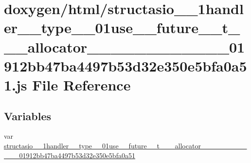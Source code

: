 \hypertarget{structasio__1__1handler____type__3__01use____future____t__3__01__allocator__01__4__00__01__01__0b458042eb63793051fb749e5370b64c7}{}\section{doxygen/html/structasio\+\_\+\_\+1handler\+\_\+\+\_\+type\+\_\+\_\+01use\+\_\+\+\_\+future\+\_\+\+\_\+t\+\_\+\_\+\_\+allocator\+\_\+\_\+\_\+\_\+\_\+\_\+\_\+\_\+\_\+\_\+\_\+\_\+01912bb47ba4497b53d32e350e5bfa0a51.js File Reference}
\label{structasio__1__1handler____type__3__01use____future____t__3__01__allocator__01__4__00__01__01__0b458042eb63793051fb749e5370b64c7}
\subsection*{Variables}
\begin{DoxyCompactItemize}
\item 
var \hyperlink{structasio__1__1handler____type__3__01use____future____t__3__01__allocator__01__4__00__01__01__0b458042eb63793051fb749e5370b64c7_a3e67da56cc7d35774eb88f697cfbac3a}{structasio\+\_\+\_\+1handler\+\_\+\+\_\+type\+\_\+\_\+01use\+\_\+\+\_\+future\+\_\+\+\_\+t\+\_\+\_\+\_\+allocator\+\_\+\_\+\_\+\_\+\_\+\_\+\_\+\_\+\_\+\_\+\_\+\_\+01912bb47ba4497b53d32e350e5bfa0a51}
\end{DoxyCompactItemize}


